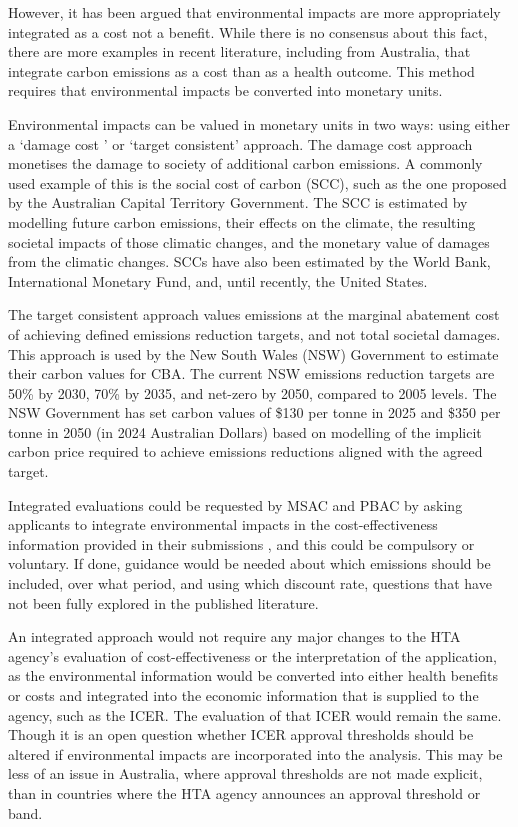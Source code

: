 \begin{refsection}
However, it has been argued that environmental impacts are more appropriately integrated as a cost not a benefit.\cite{hensher_incorporating_2020} While there is no consensus about this fact, there are more examples in recent literature, including from Australia, that integrate carbon emissions as a cost than as a health outcome.\cite{de_preux_beyond_2018, dunbar_balancing_2025} This method requires that environmental impacts be converted into monetary units. 

Environmental impacts can be valued in monetary units in two ways: using either a ‘damage cost ’ or ‘target consistent’ approach.\cite{aldy_keep_2021, nsw_government_carbon_2024} The damage cost approach monetises the damage to society of additional carbon emissions. A commonly used example of this is the social cost of carbon (SCC), such as the one proposed by the Australian Capital Territory Government.\cite{australian_capital_territory_government_act_2019} The SCC is estimated by modelling future carbon emissions, their effects on the climate, the resulting societal impacts of those climatic changes, and the monetary value of damages from the climatic changes. SCCs have also been estimated by the World Bank, International Monetary Fund, and, until recently, the United States.\cite{hensher_incorporating_2020} 

The target consistent approach values emissions at the marginal abatement cost of achieving defined emissions reduction targets, and not total societal damages. This approach is used by the New South Wales (NSW) Government to estimate their carbon values for CBA.\cite{nsw_government_carbon_2024} The current NSW emissions reduction targets are 50\% by 2030, 70\% by 2035, and net-zero by 2050, compared to 2005 levels. The NSW Government has set carbon values of \$130 per tonne in 2025 and \$350 per tonne in 2050 (in 2024 Australian Dollars) based on modelling of the implicit carbon price required to achieve emissions reductions aligned with the agreed target. 

Integrated evaluations could be requested by MSAC and PBAC by asking applicants to integrate environmental impacts in the cost-effectiveness information provided in their submissions , and this could be compulsory or voluntary. If done, guidance would be needed about which emissions should be included, over what period, and using which discount rate, questions that have not been fully explored in the published literature.

An integrated approach would not require any major changes to the HTA agency’s evaluation of cost-effectiveness or the interpretation of the application, as the environmental information would be converted into either health benefits or costs and integrated into the economic information that is supplied to the agency, such as the ICER. The evaluation of that ICER would remain the same. Though it is an open question whether ICER approval thresholds should be altered if environmental impacts are incorporated into the analysis. This may be less of an issue in Australia, where approval thresholds are not made explicit, than in countries where the HTA agency announces an approval threshold or band. 


\end{refsection}
